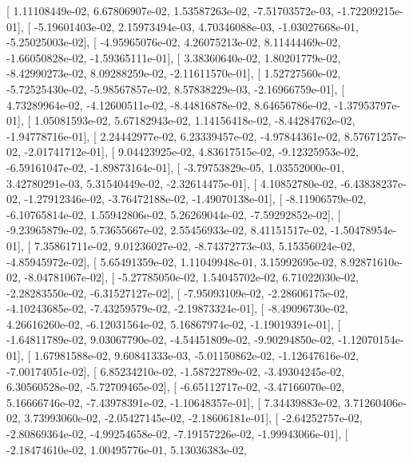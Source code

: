 \documentclass{article}
\begin{document}
       [  1.11108449e-02,   6.67806907e-02,   1.53587263e-02,
         -7.51703572e-03,  -1.72209215e-01],
       [ -5.19601403e-02,   2.15973494e-03,   4.70346088e-03,
         -1.03027668e-01,  -5.25025003e-02],
       [ -4.95965076e-02,   4.26075213e-02,   8.11444469e-02,
         -1.66050828e-02,  -1.59365111e-01],
       [  3.38360640e-02,   1.80201779e-02,  -8.42990273e-02,
          8.09288259e-02,  -2.11611570e-01],
       [  1.52727560e-02,  -5.72525430e-02,  -5.98567857e-02,
          8.57838229e-03,  -2.16966759e-01],
       [  4.73289964e-02,  -4.12600511e-02,  -8.44816878e-02,
          8.64656786e-02,  -1.37953797e-01],
       [  1.05081593e-02,   5.67182943e-02,   1.14156418e-02,
         -8.44284762e-02,  -1.94778716e-01],
       [  2.24442977e-02,   6.23339457e-02,  -4.97844361e-02,
          8.57671257e-02,  -2.01741712e-01],
       [  9.04423925e-02,   4.83617515e-02,  -9.12325953e-02,
         -6.59161047e-02,  -1.89873164e-01],
       [ -3.79753829e-05,   1.03552000e-01,   3.42780291e-03,
          5.31540449e-02,  -2.32614475e-01],
       [  4.10852780e-02,  -6.43838237e-02,  -1.27912346e-02,
         -3.76472188e-02,  -1.49070138e-01],
       [ -8.11906579e-02,  -6.10765814e-02,   1.55942806e-02,
          5.26269044e-02,  -7.59292852e-02],
       [ -9.23965879e-02,   5.73655667e-02,   2.55456933e-02,
          8.41151517e-02,  -1.50478954e-01],
       [  7.35861711e-02,   9.01236027e-02,  -8.74372773e-03,
          5.15356024e-02,  -4.85945972e-02],
       [  5.65491359e-02,   1.11049948e-01,   3.15992695e-02,
          8.92871610e-02,  -8.04781067e-02],
       [ -5.27785050e-02,   1.54045702e-02,   6.71022030e-02,
         -2.28283550e-02,  -6.31527127e-02],
       [ -7.95093109e-02,  -2.28606175e-02,  -4.10243685e-02,
         -7.43259579e-02,  -2.19873324e-01],
       [ -8.49096730e-02,   4.26616260e-02,  -6.12031564e-02,
          5.16867974e-02,  -1.19019391e-01],
       [ -1.64811789e-02,   9.03067790e-02,  -4.54451809e-02,
         -9.90294850e-02,  -1.12070154e-01],
       [  1.67981588e-02,   9.60841333e-03,  -5.01150862e-02,
         -1.12647616e-02,  -7.00174051e-02],
       [  6.85234210e-02,  -1.58722789e-02,  -3.49304245e-02,
          6.30560528e-02,  -5.72709465e-02],
       [ -6.65112717e-02,  -3.47166070e-02,   5.16666746e-02,
         -7.43978391e-02,  -1.10648357e-01],
       [  7.34439883e-02,   3.71260406e-02,   3.73993060e-02,
         -2.05427145e-02,  -2.18606181e-01],
       [ -2.64252757e-02,  -2.80869364e-02,  -4.99254658e-02,
         -7.19157226e-02,  -1.99943066e-01],
       [ -2.18474610e-02,   1.00495776e-01,   5.13036383e-02,
\end{document}
